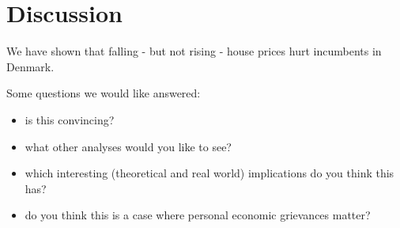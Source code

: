 \documentclass[aspectratio=169]{beamer}
\begin{document}
\section{Discussion}

	\begin{frame}
	We have shown that falling - but not rising - house prices hurt incumbents in Denmark.
	
	\vspace{0.2in}
	
	Some questions we would like answered:
	\begin{itemize}
		\item is this convincing?
		\item what other analyses would you like to see?
		\item which interesting (theoretical and real world) implications do you think this has?
		\item do you think this is a case where personal economic grievances matter? 
	\end{itemize}	
		
	\end{frame}		
\end{document}
